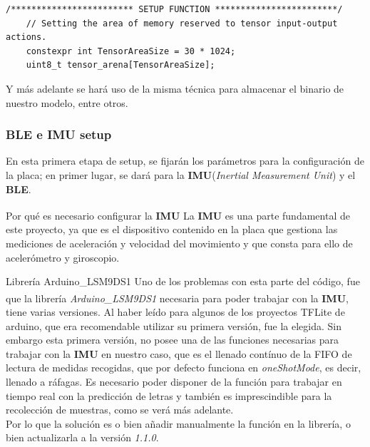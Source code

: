 \begin{lstlisting}[firstnumber=62,title=Fragmento de \textit{deep\_pen.ino}]
    /************************ SETUP FUNCTION ************************/
    // Setting the area of memory reserved to tensor input-output actions.
    constexpr int TensorAreaSize = 30 * 1024;
    uint8_t tensor_arena[TensorAreaSize];
\end{lstlisting}

Y más adelante se hará uso de la misma técnica para almacenar el binario de
nuestro modelo, entre otros.

\subsubsection{BLE e IMU setup}
En esta primera etapa de setup, se fijarán los parámetros para la configuración
de la placa; en primer lugar, se dará para la \textbf{IMU}(\textit{Inertial
Measurement Unit}) y el \textbf{BLE}.
\begin{teoria}{Por qué es necesario configurar la \textbf{IMU}\textsuperscript{\cite{imuteoria}}}
    La \textbf{IMU} es una parte fundamental de este proyecto, ya que es
    el dispositivo contenido en la placa que gestiona las mediciones de
    aceleración y velocidad del movimiento y que consta para ello de
    acelerómetro y giroscopio.
\end{teoria}

\begin{problemas}{Librería Arduino\_LSM9DS1}
    \color{mitexto}
    Uno de los problemas con esta parte del código, fue que
    la librería \textit{Arduino\_LSM9DS1}\textsuperscript{\cite{lsm9ds1}} necesaria para poder trabajar con
    la \textbf{IMU}, tiene varias versiones.
    Al haber leído para algunos de los proyectos TFLite de
    arduino, que era recomendable utilizar su primera versión, fue la elegida.
    Sin embargo esta primera versión, no posee una de las funciones
    necesarias para trabajar con la \textbf{IMU} en nuestro caso,
    que es el llenado
    contínuo de la FIFO de lectura de medidas recogidas, que por defecto
    funciona en \textit{oneShotMode}, es decir, llenado a ráfagas.
    Es necesario poder disponer de la función para trabajar en tiempo
    real con la predicción de letras y también es imprescindible para la
    recolección de muestras, como se verá más adelante.\\
    Por lo que la solución es o bien añadir manualmente la función en la
    librería, o bien actualizarla a la versión \textit{1.1.0}.
\end{problemas}

